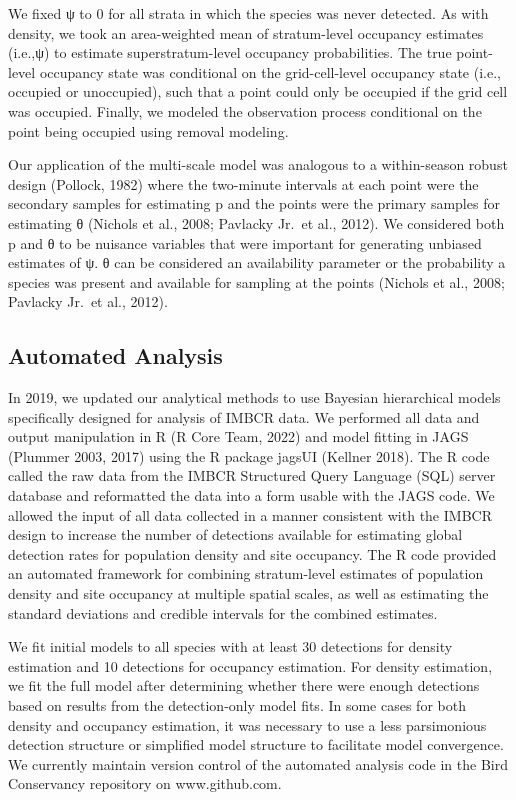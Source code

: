 \documentclass[
  letterpaper,
  DIV=11,
  numbers=noendperiod,
  oneside]{scrreprt}
\begin{document}
We fixed ψ to 0 for all strata in which the species was never detected.
As with density, we took an area-weighted mean of stratum-level
occupancy estimates (i.e.,ψ) to estimate superstratum-level occupancy
probabilities. The true point-level occupancy state was conditional on
the grid-cell-level occupancy state (i.e., occupied or unoccupied), such
that a point could only be occupied if the grid cell was occupied.
Finally, we modeled the observation process conditional on the point
being occupied using removal modeling.

Our application of the multi-scale model was analogous to a
within-season robust design (Pollock, 1982) where the two-minute
intervals at each point were the secondary samples for estimating p and
the points were the primary samples for estimating θ (Nichols et al.,
2008; Pavlacky Jr.~et al., 2012). We considered both p and θ to be
nuisance variables that were important for generating unbiased estimates
of ψ. θ can be considered an availability parameter or the probability a
species was present and available for sampling at the points (Nichols et
al., 2008; Pavlacky Jr.~et al., 2012).

\hypertarget{automated-analysis}{%
\subsection{Automated Analysis}\label{automated-analysis}}

In 2019, we updated our analytical methods to use Bayesian hierarchical
models specifically designed for analysis of IMBCR data. We performed
all data and output manipulation in R (R Core Team, 2022) and model
fitting in JAGS (Plummer 2003, 2017) using the R package jagsUI (Kellner
2018). The R code called the raw data from the IMBCR Structured Query
Language (SQL) server database and reformatted the data into a form
usable with the JAGS code. We allowed the input of all data collected in
a manner consistent with the IMBCR design to increase the number of
detections available for estimating global detection rates for
population density and site occupancy. The R code provided an automated
framework for combining stratum-level estimates of population density
and site occupancy at multiple spatial scales, as well as estimating the
standard deviations and credible intervals for the combined estimates.

We fit initial models to all species with at least 30 detections for
density estimation and 10 detections for occupancy estimation. For
density estimation, we fit the full model after determining whether
there were enough detections based on results from the detection-only
model fits. In some cases for both density and occupancy estimation, it
was necessary to use a less parsimonious detection structure or
simplified model structure to facilitate model convergence. We currently
maintain version control of the automated analysis code in the Bird
Conservancy repository on www.github.com.
\end{document}
